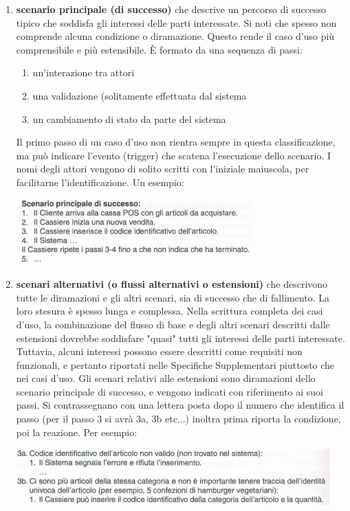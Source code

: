 \documentclass[a4paper,12pt, oneside]{book}
\begin{document}
\begin{enumerate}
	\item \textbf{scenario principale (di successo)} che descrive un percorso di successo tipico che soddisfa gli interessi delle parti interessate. Si noti che spesso non comprende alcuna condizione o diramazione. Questo rende il caso d'uso più comprensibile e più estensibile. È formato da una sequenza di passi:
	\begin{enumerate}
		\item un'interazione tra attori
		\item una validazione (solitamente effettuata dal sistema
		\item un cambiamento di stato da parte del sistema
	\end{enumerate}
	Il primo passo di un caso d'uso non rientra sempre in questa classificazione, ma può indicare l'evento (trigger) che scatena l'esecuzione dello scenario. I nomi degli attori vengono di solito scritti con l'iniziale maiuscola, per facilitarne l'identificazione. Un esempio:
	\begin{center}
		\includegraphics[scale=1.1]{img/pri.png}
	\end{center}
	\item \textbf{scenari alternativi (o flussi alternativi o estensioni)} che descrivono tutte le diramazioni e gli altri scenari, sia di successo che di fallimento. La loro stesura è spesso lunga e complessa. Nella scrittura completa dei casi d'uso, la combinazione del flusso di base e degli altri scenari descritti dalle estensioni dovrebbe soddisfare "quasi" tutti gli interessi delle parti interessate. Tuttavia, alcuni interessi possono essere descritti come requisiti non funzionali, e pertanto riportati nelle Specifiche Supplementari piuttosto che nei casi d'uso. Gli scenari relativi alle estensioni sono diramazioni dello scenario principale di successo, e vengono indicati con riferimento ai suoi passi. Si contrassegnano con una lettera posta dopo il numero che identifica il passo (per il passo 3 si avrà 3a, 3b etc...) inoltra prima riporta la condizione, poi la reazione. Per esempio:
	\begin{center}
		\includegraphics[scale=0.9]{img/alt.png}

\end{center}
\end{enumerate}
\end{document}
